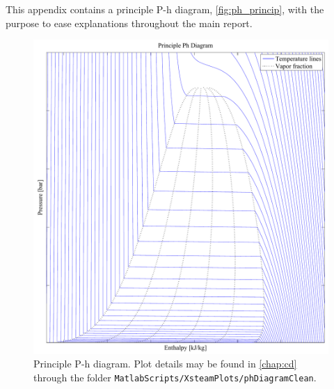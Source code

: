 This appendix contains a principle P-h diagram, \autoref{fig:ph_princip}, with the purpose to ease explanations throughout the main report.
\begin{figure}[H]
	\centering
		\includegraphics[width=1\textwidth]{appendices/pictures/phPrinciple.pdf} %
		\caption{Principle P-h diagram. Plot details may be found in \autoref{chap:cd} through the folder \texttt{MatlabScripts/XsteamPlots/phDiagramClean}.}
	\label{fig:ph_princip}
\end{figure}